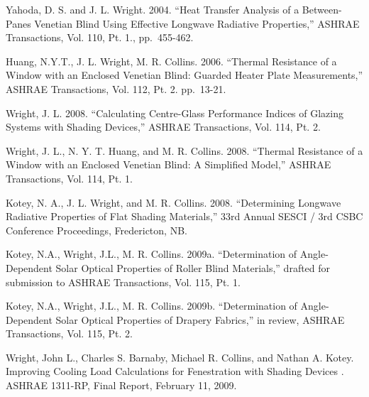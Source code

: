Yahoda, D. S. and J. L. Wright. 2004. ``Heat Transfer Analysis of a Between-Panes Venetian Blind Using Effective Longwave Radiative Properties,'' ASHRAE Transactions, Vol. 110, Pt. 1., pp.~455-462.

Huang, N.Y.T., J. L. Wright, M. R. Collins. 2006. ``Thermal Resistance of a Window with an Enclosed Venetian Blind: Guarded Heater Plate Measurements,'' ASHRAE Transactions, Vol. 112, Pt. 2. pp.~13-21.

Wright, J. L. 2008. ``Calculating Centre-Glass Performance Indices of Glazing Systems with Shading Devices,'' ASHRAE Transactions, Vol. 114, Pt. 2.

Wright, J. L., N. Y. T. Huang, and M. R. Collins. 2008. ``Thermal Resistance of a Window with an Enclosed Venetian Blind: A Simplified Model,'' ASHRAE Transactions, Vol. 114, Pt. 1.

Kotey, N. A., J. L. Wright, and M. R. Collins. 2008. ``Determining Longwave Radiative Properties of Flat Shading Materials,'' 33rd Annual SESCI / 3rd CSBC Conference Proceedings, Fredericton, NB.

Kotey, N.A., Wright, J.L., M. R. Collins. 2009a. ``Determination of Angle-Dependent Solar Optical Properties of Roller Blind Materials,'' drafted for submission to ASHRAE Transactions, Vol. 115, Pt. 1.

Kotey, N.A., Wright, J.L., M. R. Collins. 2009b. ``Determination of Angle-Dependent Solar Optical Properties of Drapery Fabrics,'' in review, ASHRAE Transactions, Vol. 115, Pt. 2.

Wright, John L., Charles S. Barnaby, Michael R. Collins, and Nathan A. Kotey. Improving Cooling Load Calculations for Fenestration with Shading Devices . ASHRAE 1311-RP, Final Report, February 11, 2009.
